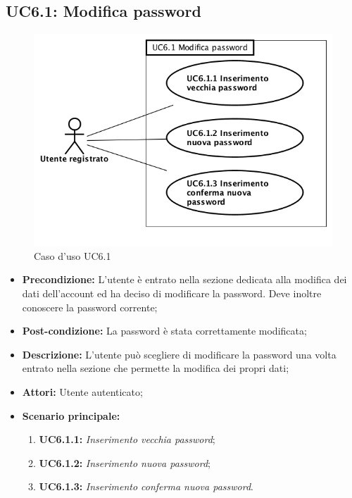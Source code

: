 \newpage
\subsection{ UC6.1: Modifica password}

\begin{figure}[h]
	\begin{center}
	\includegraphics[scale=0.4]{diagram/UC6-1.png}
	\caption{Caso d'uso UC6.1}
	\end{center}
\end{figure}
\begin{itemize}
	\item \textbf{Precondizione:} L’utente è entrato nella sezione dedicata alla modifica dei dati dell’account ed ha deciso di modificare la password. Deve inoltre conoscere la password corrente;
	\item \textbf{Post-condizione:} La password è stata correttamente modificata;
	\item \textbf{Descrizione:} L’utente può scegliere di modificare la password una volta entrato nella sezione che permette la modifica dei propri dati;
	\item \textbf{Attori:} Utente autenticato;
	\item \textbf{Scenario principale:}
	\begin{enumerate}
		\item \textbf{ UC6.1.1:} \textit{ Inserimento vecchia password};
		\item \textbf{ UC6.1.2:} \textit{ Inserimento nuova password};
		\item \textbf{ UC6.1.3:} \textit{ Inserimento conferma nuova password}.
	\end{enumerate}
\end{itemize}
